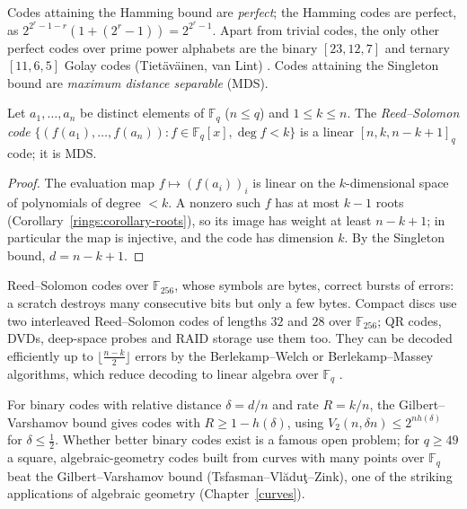 Codes attaining the Hamming bound are \emph{perfect}; the Hamming codes are perfect, as $2^{2^r - 1 - r}(1 + (2^r - 1)) = 2^{2^r - 1}$. Apart from trivial codes, the only other perfect codes over prime power alphabets are the binary
$[23, 12, 7]$ and ternary $[11, 6, 5]$ Golay codes (Tiet\"av\"ainen, van Lint) \cite{macwilliams-sloane}. Codes attaining the Singleton bound are \emph{maximum distance separable} (MDS).

\begin{theorem}\label{information-theory:theorem-reed-solomon}
Let $a_1, \ldots, a_n$ be distinct elements of $\mathbb{F}_q$ ($n \leq q$) and $1 \leq k \leq n$. The \emph{Reed--Solomon code} $\{(f(a_1), \ldots, f(a_n)) : f \in \mathbb{F}_q[x], \deg f < k\}$ is a linear $[n, k, n - k + 1]_q$ code; it is MDS.
\end{theorem}

\begin{proof}
The evaluation map $f \mapsto (f(a_i))_i$ is linear on the $k$-dimensional space of polynomials of degree $< k$. A nonzero such $f$ has at most $k - 1$ roots (Corollary~\ref{rings:corollary-roots}), so its image has weight at least
$n - k + 1$; in particular the map is injective, and the code has dimension $k$. By the Singleton bound, $d = n - k + 1$.
\end{proof}

\begin{example}\label{information-theory:example-reed-solomon}
Reed--Solomon codes over $\mathbb{F}_{256}$, whose symbols are bytes, correct bursts of errors: a scratch destroys many consecutive bits but only a few bytes. Compact discs use two interleaved Reed--Solomon codes of lengths
$32$ and $28$ over $\mathbb{F}_{256}$; QR codes, DVDs, deep-space probes and RAID storage use them too. They can be decoded efficiently up to $\lfloor\frac{n - k}{2}\rfloor$ errors by the Berlekamp--Welch or Berlekamp--Massey algorithms,
which reduce decoding to linear algebra over $\mathbb{F}_q$ \cite{macwilliams-sloane}.
\end{example}

\begin{remark}\label{information-theory:remark-asymptotic-codes}
For binary codes with relative distance $\delta = d/n$ and rate $R = k/n$, the Gilbert--Varshamov bound gives codes with $R \geq 1 - h(\delta)$, using $V_2(n, \delta n) \leq 2^{nh(\delta)}$ for $\delta \leq \frac12$. Whether better binary codes
exist is a famous open problem; for $q \geq 49$ a square, algebraic-geometry codes built from curves with many points over $\mathbb{F}_q$ beat the Gilbert--Varshamov bound (Tsfasman--Vl\u{a}du\c{t}--Zink), one of the striking
applications of algebraic geometry (Chapter~\ref{curves}).
\end{remark}

